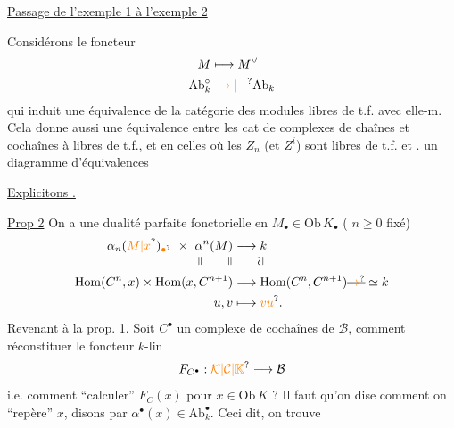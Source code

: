 \uline{Passage de l'exemple 1 à l'exemple 2}

Considérons le foncteur
\[
\begin{aligned}
 M&\longmapsto M^\vee\\
 \mathrm{Ab}_k^\circ&\unsure{\longrightarrow|-}\mathrm{Ab}_k
\end{aligned}
\]
qui induit une équivalence de la catégorie des modules libres de t.f. avec elle-m.
Cela donne aussi une équivalence entre les cat de complexes de chaînes et cochaînes
à   libres de t.f., et en
celles où les $Z_n$ (et $Z^i$) sont libres de t.f. et .
  
 
un diagramme d'équivalences




\uline{Explicitons .}

\uline{Prop 2} On a une dualité parfaite fonctorielle en $M_\bullet\in\mathrm{Ob}\,K_\bullet$
( $n\geq0$ fixé)
\[
\begin{aligned}
 \alpha_n(\unsure{M|x})_{\unsure{\bullet}}\ \times\ 
 \alpha^n(M)&\longrightarrow k\\[-2pt]
 \rotatebox{90}{$=$}\qquad \rotatebox{90}{$=$} &\qquad \rotatebox{90}{$\simeq$}\\
 \mathrm{Hom}(C^n,x)\times\mathrm{Hom}(x,C^{n+1})&\longrightarrow
 \mathrm{Hom}(C^n,C^{n+1})\deleted{\unsure{\to}}\simeq k\\
 u,v&\longmapsto\unsure{vu}.
\end{aligned}
\]
Revenant à la prop. 1. Soit $C^\bullet$ 
un complexe de cochaînes de $\mathcal B$, comment réconstituer le foncteur $k$-lin
\[
 F_{C^\bullet}: \unsure{\mathcal K|\mathcal C|\mathbb K}\longrightarrow\mathcal B
\]
i.e. comment ``calculer'' $F_C(x)$ pour $x\in\mathrm{Ob}\,K$ ?
Il faut qu'on dise comment on ``repère'' $x$,
disons par $\alpha^\bullet(x)\in\mathrm{Ab}_k^\bullet$. Ceci dit, on trouve

